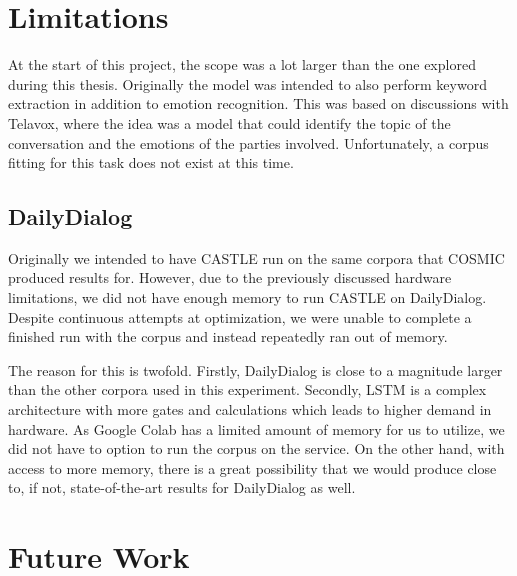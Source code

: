 \documentclass[nofilelist]{cslthse-msc}
\begin{document}
\section{Limitations}

At the start of this project, the scope was a lot larger than the one explored during this thesis. Originally the model was intended to also perform keyword extraction in addition to emotion recognition. This was based on discussions with Telavox, where the idea was a model that could identify the topic of the conversation and the emotions of the parties involved. Unfortunately, a corpus fitting for this task does not exist at this time. 



\subsection*{DailyDialog}
Originally we intended to have CASTLE run on the same corpora that COSMIC produced results for. However, due to the previously discussed hardware limitations, we did not have enough memory to run CASTLE on DailyDialog. Despite continuous attempts at optimization, we were unable to complete a finished run with the corpus and instead repeatedly ran out of memory. 

The reason for this is twofold. Firstly, DailyDialog is close to a magnitude larger than the other corpora used in this experiment. Secondly, LSTM is a complex architecture with more gates and calculations which leads to higher demand in hardware. As Google Colab has a limited amount of memory for us to utilize, we did not have to option to run the corpus on the service. On the other hand, with access to more memory, there is a great possibility that we would produce close to, if not, state-of-the-art results for DailyDialog as well. 

\section{Future Work}
\end{document}
